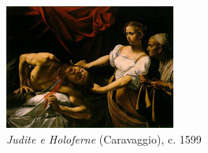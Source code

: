 \begin{figure}
  \vspace{-15pt}
  \begin{centering}
    \caption{\emph{Judite e Holoferne} (Caravaggio), c. 1599}
    \label{fig:caravaggio:judite}
    \includegraphics[width=0.5\textwidth]{figs/caravaggio_judite.png}
  \end{centering}
  
\end{figure}

